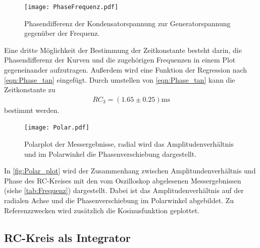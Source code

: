 \begin{figure}[H]
  \centering
  \texttt{[image: PhaseFrequenz.pdf]}
  \caption{Phasendifferenz der Kondensatorspannung zur Generatorspannung gegenüber der Frequenz.}
  \label{fig:PhaseFrequenz_plot}
\end{figure}
\noindent Eine dritte Möglichkeit der Bestimmung der Zeitkonstante besteht darin, die Phasendifferenz der Kurven und die zugehörigen Frequenzen in einem Plot gegeneinander
aufzutragen. Außerdem wird eine Funktion der Regression nach \autoref{eqn:Phase_tan} eingefügt. Durch umstellen von \autoref{eqn:Phase_tan} kann die Zeitkonstante zu
\begin{align*}
  RC_3=(1.65 ± 0.25)\si{\milli\second}
\end{align*}
bestimmt werden.

\begin{figure}[H]
  \centering
  \texttt{[image: Polar.pdf]}
  \caption{Polarplot der Messergebnisse, radial wird das Amplitudenverhältnis und im Polarwinkel die Phasenverschiebung dargestellt.}
  \label{fig:Polar_plot}
\end{figure}
\noindent In \autoref{fig:Polar_plot} wird der Zusammenhang zwischen Amplitundenverhältnis und Phase des RC-Kreises mit den vom Oszilloskop abgelesenen Messergebnissen (siehe \autoref{tab:Frequenz}) dargestellt.
Dabei ist das Amplitudenverhältnis auf der radialen Achse und die Phasenverschiebung im Polarwinkel abgebildet. Zu Referenzzwecken wird zusätzlich die Kosinusfunktion geplottet.

\subsection{RC-Kreis als Integrator} %
\label{sub:Integrator}

